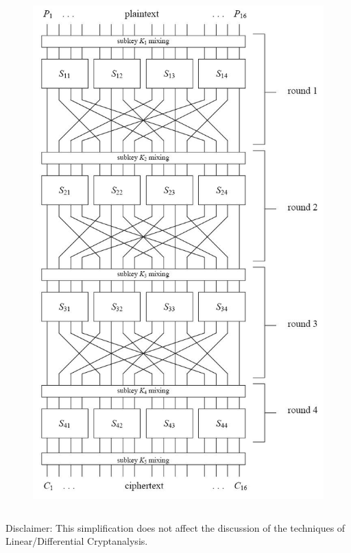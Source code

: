 \documentclass[9pt]{beamer}
\begin{document}
\begin{frame}
\begin{columns}
\begin{column}{0.4\textwidth}
\begin{figure}
\includegraphics[totalheight=0.8\textheight]{spn.jpg}
\end{figure}
\end{column}
\end{columns}

\begin{center}
{\tiny Disclaimer: This simplification does not affect the discussion of the techniques of Linear/Differential Cryptanalysis.}
\end{center}
\end{frame}
\end{document}
